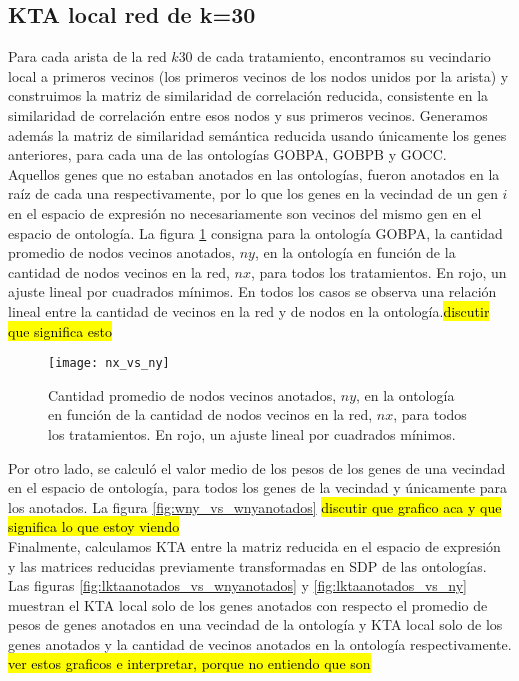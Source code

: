 \subsection{KTA local red de k=30}
Para cada arista de la red $k30$ de cada tratamiento, encontramos su vecindario local a primeros vecinos (los primeros vecinos de los nodos unidos por la arista) y construimos la matriz de similaridad de correlación reducida, consistente en la similaridad de correlación entre esos nodos y sus primeros vecinos. Generamos además la matriz de similaridad semántica reducida usando únicamente los genes anteriores, para cada una de las ontologías GOBPA, GOBPB y GOCC.\\
Aquellos genes que no estaban anotados en las ontologías, fueron anotados en la raíz de cada una respectivamente, por lo que los genes en la vecindad de un gen $i$ en el espacio de expresión no necesariamente son vecinos del mismo gen en el espacio de ontología. La figura \ref{fig:nx_vs_ny} consigna para la ontología GOBPA, la cantidad promedio de nodos vecinos anotados, $ny$, en la ontología en función de la cantidad de nodos vecinos en la red, $nx$, para todos los tratamientos. En rojo, un ajuste lineal por cuadrados mínimos. En todos los casos se observa una relación lineal entre la cantidad de vecinos en la red y de nodos en la ontología.\hl{discutir que significa esto}\\
\begin{figure}[h]
\centering
\texttt{[image: nx\_vs\_ny]}
\caption{Cantidad promedio de nodos vecinos anotados, $ny$, en la ontología en función de la cantidad de nodos vecinos en la red, $nx$, para todos los tratamientos. En rojo, un ajuste lineal por cuadrados mínimos.}
\label{fig:nx_vs_ny}
\end{figure}
Por otro lado, se calculó el valor medio de los pesos de los genes de una vecindad en el espacio de ontología, para todos los genes de la vecindad y únicamente para los anotados. La figura \ref{fig:wny_vs_wnyanotados} \hl{discutir que grafico aca y que significa lo que estoy viendo} \\
Finalmente, calculamos KTA entre la matriz reducida en el espacio de expresión y las matrices reducidas previamente transformadas en SDP de las ontologías.\\
Las figuras \ref{fig:lktaanotados_vs_wnyanotados} y \ref{fig:lktaanotados_vs_ny} muestran el KTA local solo de los genes anotados con respecto el promedio de pesos de genes anotados en una vecindad de la ontología y KTA local solo de los genes anotados y la cantidad de vecinos anotados en la ontología respectivamente. \hl{ver estos graficos e interpretar, porque no entiendo que son}





